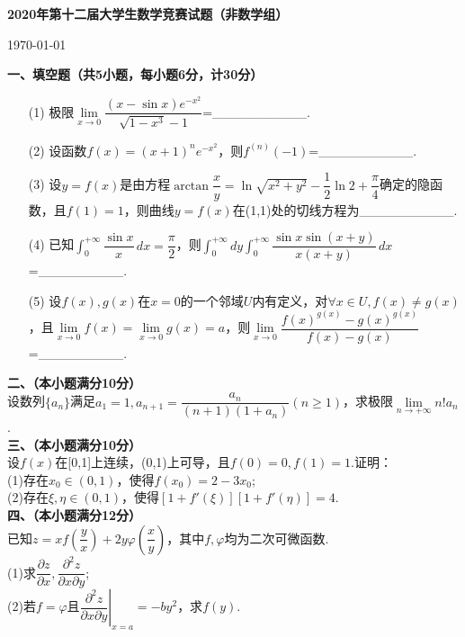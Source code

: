 \documentclass[UTF8]{ctexart}
\begin{document}
	\begin{center}
		\par \Large{\textbf{2020年第十二届大学生数学竞赛试题（非数学组）}}
		\par \normalsize\today
	\end{center}
	\textbf{一、填空题（共5小题，每小题6分，计30分）}
	\begin{enumerate}
		\item [(1)]极限$\lim\limits_{x\rightarrow 0} \dfrac{(x-\sin x)e^{-x^{2}}}{\sqrt{1-x^{3}}-1}$=\_\_\_\_\_\_\_\_\_\_.
		\item [(2)]设函数$f(x)=(x+1)^{n}e^{-x^{2}}$，则$f^{(n)}(-1)$=\_\_\_\_\_\_\_\_\_\_.
		\item [(3)]设$y=f(x)$是由方程$\arctan \dfrac{x}{y}=\ln \sqrt{x^{2}+y^{2}}-\dfrac{1}{2}\ln 2+\dfrac {\pi}{4}$确定的隐函数，且$f(1)=1$，则曲线$y=f(x)$在(1,1)处的切线方程为\_\_\_\_\_\_\_\_\_\_.
		\item [(4)]已知$\displaystyle\int_{0}^{+\infty}\dfrac{\sin x}{x}\,dx=\dfrac {\pi}{2}$，则$\displaystyle\int_{0}^{+\infty}dy\int_{0}^{+\infty}\dfrac{\sin x\sin (x+y)}{x(x+y)}\,dx$=\_\_\_\_\_\_\_\_\_.
		\item [(5)]设$f(x),g(x)$在$x=0$的一个邻域$U$内有定义，对$\forall x\in U,f(x)\neq g(x)$，且$\lim\limits_{x\rightarrow 0}f(x)=\lim\limits_{x\rightarrow 0}g(x)=a$，则$\lim\limits_{x\rightarrow 0} \dfrac{f(x)^{g(x)}-g(x)^{g(x)}}{f(x)-g(x)}$=\_\_\_\_\_\_\_\_\_.
	\end{enumerate}
	\textbf{二、（本小题满分10分）}\\
	设数列$\{a_{n}\}$满足$a_{1}=1,a_{n+1}=\dfrac{a_{n}}{(n+1)(1+a_{n})}(n\geq 1)$，求极限$\lim\limits_{n\rightarrow +\infty}n!a_{n}$.\\
	\textbf{三、（本小题满分10分）}\\
	设$f(x)$在[0,1]上连续，(0,1)上可导，且$f(0)=0,f(1)=1$.证明：\\
	(1)存在$x_{0}\in (0,1)$，使得$f(x_{0})=2-3x_{0}$;\\
	(2)存在$\xi ,\eta \in (0,1)$，使得$[1+f'(\xi)][1+f'(\eta)]=4$.\\
	\textbf{四、（本小题满分12分）}\\
	已知$z=xf(\dfrac{y}{x})+2y\varphi(\dfrac{x}{y})$，其中$f,\varphi$均为二次可微函数.\\
	(1)求$\dfrac{\partial z}{\partial x},\dfrac{\partial^{2}z}{\partial{x}\partial{y}}$;\\
	(2)若$f=\varphi$且$\left.\dfrac{\partial^{2}z}{\partial{x}\partial{y}}\right| _{x=a}=-by^{2}$，求$f(y)$.\\\\
\end{document}
